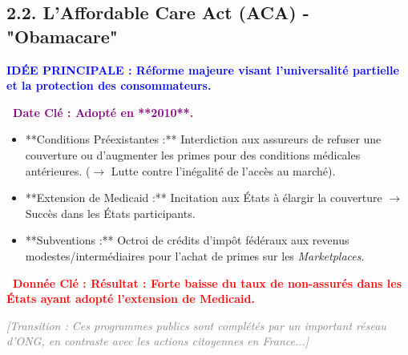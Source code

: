 \documentclass[10pt, a4paper]{article}
\newcommand{\IdeeP}[1]{\noindent\textbf{\textcolor{blue}{IDÉE PRINCIPALE : #1}}\par}
\newcommand{\ChiffreCle}[1]{\noindent\textbf{\textcolor{red}{\textbullet\ Donnée Clé : #1}}\par}
\newcommand{\Transition}[1]{\vspace{1em}\noindent\textit{\textcolor{gray}{[Transition : #1]}}\par}
\newcommand{\DateCle}[1]{\noindent\textbf{\textcolor{purple}{\textbullet\ Date Clé : #1}}\par}
\begin{document}
\subsection*{2.2. L'Affordable Care Act (ACA) - "Obamacare"}

\IdeeP{Réforme majeure visant l'universalité partielle et la protection des consommateurs.}
\DateCle{Adopté en **2010**.}
\begin{itemize}
\item **Conditions Préexistantes :** Interdiction aux assureurs de refuser une couverture ou d'augmenter les primes pour des conditions médicales antérieures. ($\to$ Lutte contre l'inégalité de l'accès au marché).
\item **Extension de Medicaid :** Incitation aux États à élargir la couverture $\to$ Succès dans les États participants.
\item **Subventions :** Octroi de crédits d'impôt fédéraux aux revenus modestes/intermédiaires pour l'achat de primes sur les \textit{Marketplaces}.
\end{itemize}
\ChiffreCle{Résultat : Forte baisse du taux de non-assurés dans les États ayant adopté l'extension de Medicaid.}

\Transition{Ces programmes publics sont complétés par un important réseau d'ONG, en contraste avec les actions citoyennes en France...}
\end{document}
